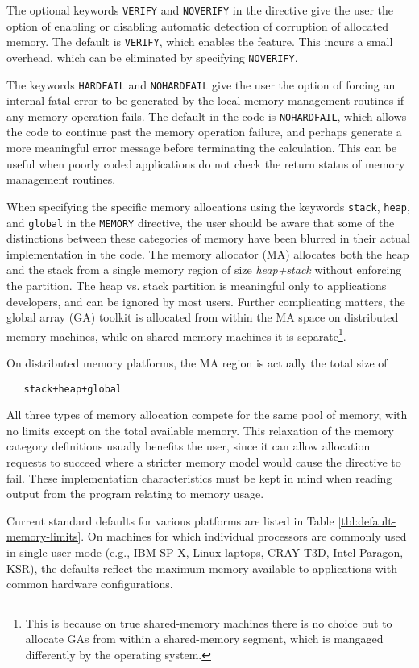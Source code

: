 The optional keywords \verb+VERIFY+ and \verb+NOVERIFY+ in the
directive give the user the option of enabling or disabling automatic
detection of corruption of allocated memory.  The default is
\verb+VERIFY+, which enables the feature. This incurs a small
overhead, which can be eliminated by specifying \verb+NOVERIFY+.

The keywords \verb+HARDFAIL+ and \verb+NOHARDFAIL+ give the user the
option of forcing an internal fatal error to be generated by the local
memory management routines if any memory operation fails.  The default
in the code is \verb+NOHARDFAIL+, which allows the code to continue
past the memory operation failure, and perhaps generate a more
meaningful error message before terminating the calculation.  This can
be useful when poorly coded applications do not check the return
status of memory management routines.

When specifying the specific memory allocations using the keywords
\verb+stack+, \verb+heap+, and \verb+global+ in the \verb+MEMORY+
directive, the user should be aware that some of the distinctions
between these categories of memory have been blurred in their actual
implementation in the code.  The memory allocator (MA) allocates both
the heap and the stack from a single memory region of size {\em
  heap+stack} without enforcing the partition.  The heap vs. stack
partition is meaningful only to applications developers, and can be
ignored by most users.  Further complicating matters, the global array
(GA) toolkit is allocated from within the MA space on distributed
memory machines, while on shared-memory machines it is
separate\footnote{This is because on true shared-memory machines there
  is no choice but to allocate GAs from within a shared-memory
  segment, which is mangaged differently by the operating system.}.

On distributed memory platforms, the MA region is actually the total
size of 
\begin{verbatim}
   stack+heap+global
\end{verbatim}
All three types of memory allocation
compete for the same pool of memory, with no limits except on the
total available memory.  This relaxation of the memory category
definitions usually benefits the user, since it can allow allocation
requests to succeed where a stricter memory model would cause the
directive to fail.  These implementation characteristics must be kept
in mind when reading output from the program relating to memory usage.

Current standard defaults for various platforms are listed in Table
\ref{tbl:default-memory-limits}.  On machines for which individual
processors are commonly used in single user mode (e.g., IBM SP-X,
Linux laptops, CRAY-T3D, Intel Paragon, KSR), the defaults reflect
the maximum memory available to applications with common hardware
configurations.

